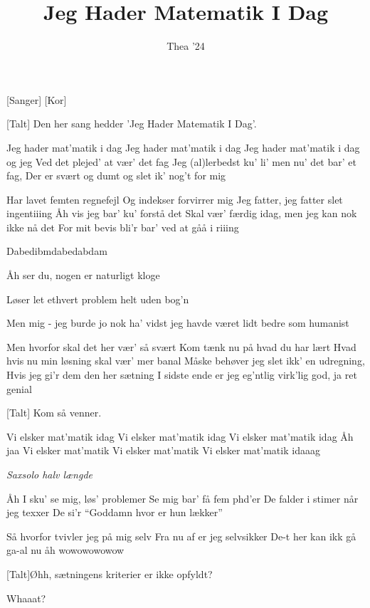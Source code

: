 \documentclass[a4paper,11pt]{article}
\title{Jeg Hader Matematik I Dag}
\author{Thea '24}
\begin{document}
\maketitle

\begin{roles}
[Sanger] 
[Kor]
\end{roles}

\begin{song}

[Talt] Den her sang hedder 'Jeg Hader Matematik I Dag'.

Jeg hader mat’matik i dag 
Jeg hader mat’matik i dag 
Jeg hader mat’matik i dag og jeg 
Ved det plejed’ at vær’ det fag 
Jeg (al)lerbedst  ku’ li’ men nu’ det bar’ et fag, 
Der er svært og dumt og slet ik’ nog’t for mig

Har lavet femten regnefejl
Og indekser forvirrer mig
Jeg fatter, jeg fatter slet ingentiiing
Åh vis jeg bar’ ku’ forstå det
Skal vær’ færdig idag, men jeg kan nok ikke nå det
For mit bevis bli’r bar’ ved at gåå i riiing

Dabedibmdabedabdam

Åh ser du, nogen er naturligt kloge

 Løser let ethvert problem helt uden bog’n

Men mig - jeg burde jo nok ha’ vidst
jeg havde været lidt bedre som humanist

Men hvorfor skal det her vær’ så svært
Kom tænk nu på hvad du har lært
Hvad hvis nu min løsning skal vær’ mer banal 
Måske behøver jeg slet ikk’ en udregning,  
Hvis jeg gi’r dem den her sætning
I sidste ende er jeg eg’ntlig virk’lig god, ja ret genial 

[Talt] Kom så venner.

Vi elsker mat’matik idag
Vi elsker mat’matik idag
Vi elsker mat’matik idag
Åh jaa
Vi elsker mat’matik 
Vi elsker mat’matik
Vi elsker mat’matik idaaag

\textit{Saxsolo halv længde}

Åh I sku’ se mig, løs’ problemer
Se mig bar’ få fem phd’er
De falder i stimer når jeg texxer
De si’r “Goddamn hvor er hun lækker”

Så hvorfor tvivler jeg på mig selv
Fra nu af er jeg selvsikker
De-t her kan ikk gå ga-al nu åh wowowowowow

[Talt]Øhh, sætningens kriterier er ikke opfyldt?

 Whaaat?


\end{song}
\end{document}

